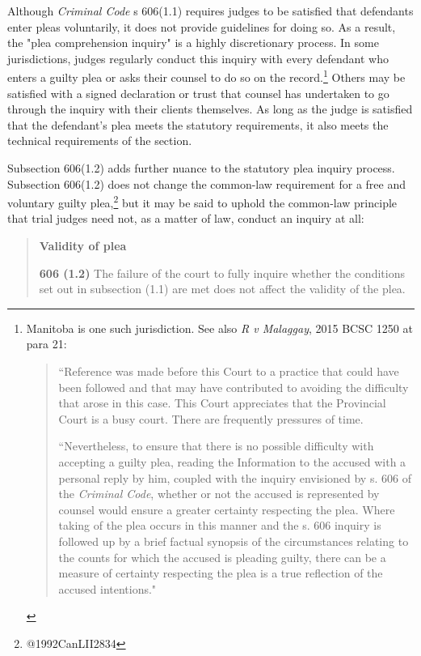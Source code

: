 Although \textit{Criminal Code} s 606(1.1) requires judges to be satisfied that defendants enter pleas voluntarily, it does not provide guidelines for doing so. As a result, the "plea comprehension inquiry" is a highly discretionary process. In some jurisdictions, judges regularly conduct this inquiry with every defendant who enters a guilty plea or asks their counsel to do so on the record.\footnote{Manitoba is one such jurisdiction. See also \textit{R v Malaggay}, 2015 BCSC 1250 at para 21: 

\begin{quote}
    ``Reference was made before this Court to a practice that could have been followed and that may have contributed to avoiding the difficulty that arose in this case. This Court appreciates that the Provincial Court is a busy court. There are frequently pressures of time.
    
    ``Nevertheless, to ensure that there is no possible difficulty with accepting a guilty plea, reading the Information to the accused with a personal reply by him, coupled with the inquiry envisioned by s. 606 of the \textit{Criminal Code}, whether or not the accused is represented by counsel would ensure a greater certainty respecting the plea. Where taking of the plea occurs in this manner and the s. 606 inquiry is followed up by a brief factual synopsis of the circumstances relating to the counts for which the accused is pleading guilty, there can be a measure of certainty respecting the plea is a true reflection of the accused intentions."
    
\end{quote}} Others may be satisfied with a signed declaration or trust that counsel has undertaken to go through the inquiry with their clients themselves. As long as the judge is satisfied that the defendant's plea meets the statutory requirements, it also meets the technical requirements of the section.

Subsection 606(1.2) adds further nuance to the statutory plea inquiry process. Subsection 606(1.2) does not change the common-law requirement for a free and voluntary guilty plea,\footnote{@1992CanLII2834} but it may be said to uphold the common-law principle that trial judges need not, as a matter of law, conduct an inquiry at all:

\begin{quote}
    \onehalfspacing
    \textbf{Validity of plea}
    
    \textbf{606 (1.2)} The failure of the court to fully inquire whether the conditions set out in subsection (1.1) are met does not affect the validity of the plea.
\end{quote}

